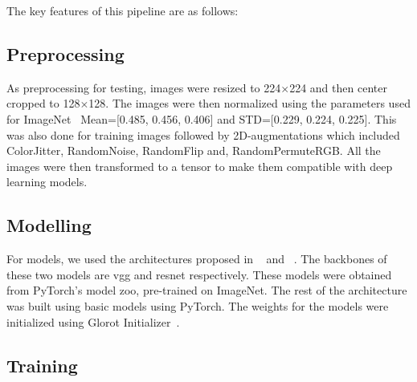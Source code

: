The key features of this pipeline are as follows:

\subsection{Preprocessing}\label{subsec:preprocessing}
As preprocessing for testing, images were resized to 224$\times$224 and then center cropped to 128$\times$128.
The images were then normalized using the parameters used for ImageNet~\cite{Deng2009ImageNetAL} Mean=[0.485, 0.456, 0.406] and STD=[0.229, 0.224, 0.225].
This was also done for training images followed by 2D-augmentations which included ColorJitter, RandomNoise, RandomFlip and, RandomPermuteRGB\@.
All the images were then transformed to a tensor to make them compatible with deep learning models.

\subsection{Modelling}\label{subsec:modelling}
For models, we used the architectures proposed in ~\cite{Xie_2019} and ~\cite{Xie_2020}.
The backbones of these two models are \gls{vgg} and \gls{resnet} respectively.
These models were obtained from PyTorch's model zoo, pre-trained on ImageNet.
The rest of the architecture was built using basic models using PyTorch.
The weights for the models were initialized using Glorot Initializer~\cite{Glorot2010UnderstandingTD}.

\subsection{Training}\label{subsec:training}


